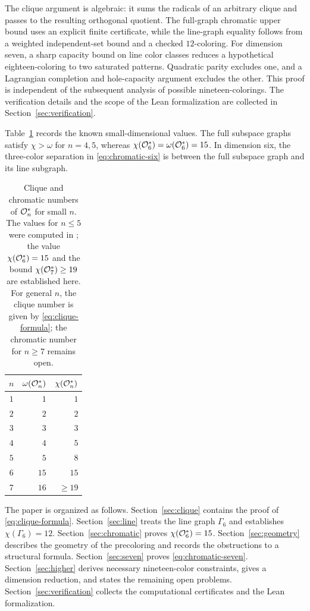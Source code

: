 The clique argument is algebraic: it sums the radicals of an arbitrary
clique and passes to the resulting orthogonal quotient.  The
full-graph chromatic upper bound uses an explicit finite certificate,
while the line-graph equality follows from a weighted independent-set
bound and a checked \(12\)-coloring.  For dimension seven, a sharp capacity bound on line color classes
reduces a hypothetical eighteen-coloring to two saturated patterns.
Quadratic parity excludes one, and a Lagrangian completion and
hole-capacity argument excludes the other. This proof is independent
of the subsequent analysis of possible nineteen-colorings.
The verification details and the scope of the Lean formalization are collected in
Section~\ref{sec:verification}.

Table~\ref{tab:small-values} records the known small-dimensional values.
The full subspace graphs satisfy \(\chi>\omega\) for \(n=4,5\), whereas
\(\chi(\mathcal O_6^*)=\omega(\mathcal O_6^*)=15\). In dimension six, the
three-color separation in \eqref{eq:chromatic-six} is between the full
subspace graph and its line subgraph.

\begin{table}[htbp]
\centering
\begin{tabular}{c|r|r}
\toprule
\(n\) & \(\omega(\mathcal O_n^*)\) & \(\chi(\mathcal O_n^*)\) \\
\midrule
\(1\) & \(1\)  & \(1\)  \\
\(2\) & \(2\)  & \(2\)  \\
\(3\) & \(3\)  & \(3\)  \\
\(4\) & \(4\)  & \(5\)  \\
\(5\) & \(5\)  & \(8\)  \\
\(6\) & \(15\) & \(15\) \\
\(7\) & \(16\) & \(\geq19\) \\
\bottomrule
\end{tabular}
\caption{Clique and chromatic numbers of \(\mathcal O_n^*\) for small \(n\).
The values for \(n\le5\) were computed in \cite{Nikandish2026}; the
value \(\chi(\mathcal O_6^*)=15\) and the bound
\(\chi(\mathcal O_7^*)\geq19\) are established here.  For general \(n\),
the clique number is given by \eqref{eq:clique-formula}; the chromatic
number for \(n\ge7\) remains open.}
\label{tab:small-values}
\end{table}

The paper is organized as follows.  Section~\ref{sec:clique} contains
the proof of \eqref{eq:clique-formula}.
Section~\ref{sec:line} treats the line graph \(\Gamma_6\) and
establishes \(\chi(\Gamma_6)=12\).
Section~\ref{sec:chromatic} proves \(\chi(\mathcal O_6^*)=15\).
Section~\ref{sec:geometry} describes the geometry of the precoloring
and records the obstructions to a structural formula.
Section~\ref{sec:seven} proves \eqref{eq:chromatic-seven}.
Section~\ref{sec:higher} derives necessary nineteen-color constraints,
gives a dimension reduction, and states the remaining open problems.
Section~\ref{sec:verification} collects the computational
certificates and the Lean formalization.
